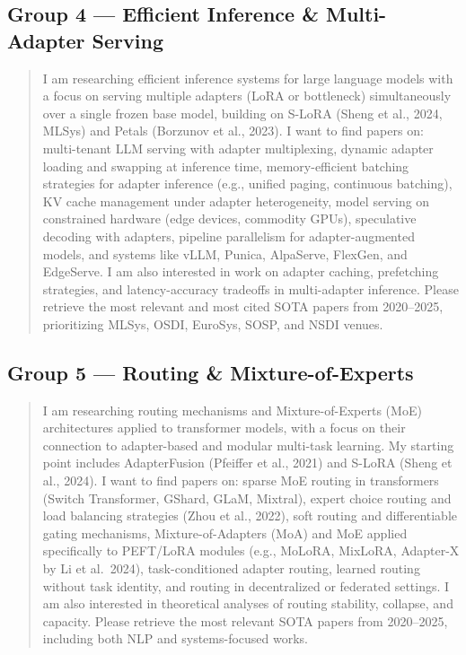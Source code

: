 \subsection*{Group 4 — Efficient Inference \& Multi-Adapter Serving}
\label{app:undermind:g4}

\begin{quote}\small
I am researching efficient inference systems for large language models with a focus
on serving multiple adapters (LoRA or bottleneck) simultaneously over a single frozen
base model, building on S-LoRA (Sheng et al., 2024, MLSys) and Petals (Borzunov
et al., 2023). I want to find papers on: multi-tenant LLM serving with adapter
multiplexing, dynamic adapter loading and swapping at inference time, memory-efficient
batching strategies for adapter inference (e.g., unified paging, continuous batching),
KV cache management under adapter heterogeneity, model serving on constrained hardware
(edge devices, commodity GPUs), speculative decoding with adapters, pipeline
parallelism for adapter-augmented models, and systems like vLLM, Punica, AlpaServe,
FlexGen, and EdgeServe. I am also interested in work on adapter caching, prefetching
strategies, and latency-accuracy tradeoffs in multi-adapter inference. Please retrieve
the most relevant and most cited SOTA papers from 2020--2025, prioritizing MLSys,
OSDI, EuroSys, SOSP, and NSDI venues.
\end{quote}

\subsection*{Group 5 — Routing \& Mixture-of-Experts}
\label{app:undermind:g5}

\begin{quote}\small
I am researching routing mechanisms and Mixture-of-Experts (MoE) architectures
applied to transformer models, with a focus on their connection to adapter-based and
modular multi-task learning. My starting point includes AdapterFusion (Pfeiffer et
al., 2021) and S-LoRA (Sheng et al., 2024). I want to find papers on: sparse MoE
routing in transformers (Switch Transformer, GShard, GLaM, Mixtral), expert choice
routing and load balancing strategies (Zhou et al., 2022), soft routing and
differentiable gating mechanisms, Mixture-of-Adapters (MoA) and MoE applied
specifically to PEFT/LoRA modules (e.g., MoLoRA, MixLoRA, Adapter-X by Li et al.\
2024), task-conditioned adapter routing, learned routing without task identity, and
routing in decentralized or federated settings. I am also interested in theoretical
analyses of routing stability, collapse, and capacity. Please retrieve the most
relevant SOTA papers from 2020--2025, including both NLP and systems-focused works.
\end{quote}

